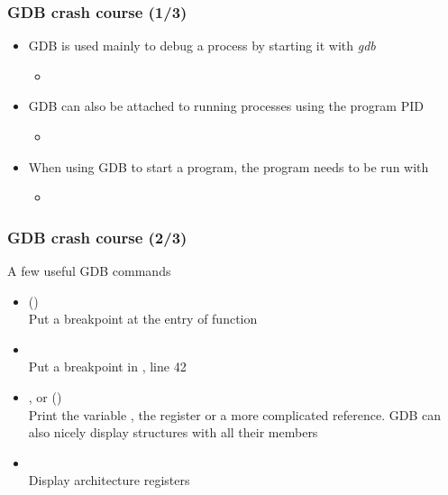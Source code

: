 \begin{frame}[fragile]
  \frametitle{GDB crash course (1/3)}
  \begin{itemize}
    \item GDB is used mainly to debug a process by starting it with {\em gdb}
    \begin{itemize}
      \item {}
    \end{itemize}
    \item GDB can also be attached to running processes using the program PID
    \begin{itemize}
      \item {}
    \end{itemize}
    \item When using GDB to start a program, the program needs to be run with
    \begin{itemize}
      \item {}
    \end{itemize}
  \end{itemize}
\end{frame}

\begin{frame}
  \frametitle{GDB crash course (2/3)}
  \small
  A few useful GDB commands
  \begin{itemize}
  \item {} ()\\
    Put a breakpoint at the entry of function 
  \item {}\\
    Put a breakpoint in , line 42
  \item {},  or  ()\\
    Print the variable , the register  or a more
    complicated reference. GDB can also nicely display structures with all
    their members
  \item {}\\
    Display architecture registers
  \end{itemize}
\end{frame}

